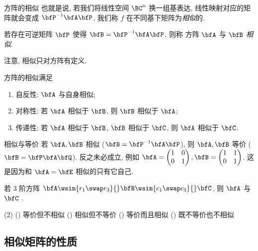 \begin{frame}{方阵的相似}
	\onslide<+->
	也就是说, 若我们将线性空间 $\BC^n$ 换一组基表达, 线性映射对应的矩阵就会变成 $\bfP^{-1}\bfA\bfP$.
	\onslide<+->
	我们称 $f$ 在不同基下矩阵为\emph{相似}的.
	\onslide<+->
	\begin{definition}
		若存在可逆矩阵 $\bfP$ 使得 $\bfB=\bfP^{-1}\bfA\bfP$, 则称 方阵 $\bfA$ 与 $\bfB$ \emph{相似}.
	\end{definition}
	\onslide<+->
	注意, 相似只对方阵有定义.
	\onslide<+->
	\begin{proposition}
		方阵的相似满足
		\begin{enumerate}
			\item 自反性: $\bfA$ 与自身相似;
			\item 对称性: 若 $\bfA$ 相似于 $\bfB$, 则 $\bfB$ 相似于 $\bfA$;
			\item 传递性: 若 $\bfA$ 相似于 $\bfB$, $\bfB$ 相似于 $\bfC$, 则 $\bfA$ 相似于 $\bfC$.
		\end{enumerate}
	\end{proposition}
\end{frame}


\begin{frame}{相似与等价}
	\onslide<+->
	若 $\bfA,\bfB$ 相似 ($\bfB=\bfP^{-1}\bfA\bfP$), 则 $\bfA,\bfB$ 等价 ($\bfB=\bfP\bfA\bfQ$).
		反之未必成立, 例如 $\bfA=\begin{pmatrix}
			1&0\\
			0&1
		\end{pmatrix}, \bfB=\begin{pmatrix}
			1&1\\
			0&1
		\end{pmatrix}$.
		这是因为和 $\bfA=\bfE$ 相似的只有它自己.
	\onslide<+->
	\begin{example}
		若 $3$ 阶方阵 $\bfA\wsim{r_1\swap r_3}{}\bfB\wsim{c_1\swap c_3}{}\bfC$, 则 $\bfA$ 与 $\bfC$ .
		\begin{exchoice}(2)
			() 等价但不相似
			() 相似但不等价
			() 等价而且相似
			() 既不等价也不相似
		\end{exchoice}
	\end{example}
\end{frame}


\subsection{相似矩阵的性质}

